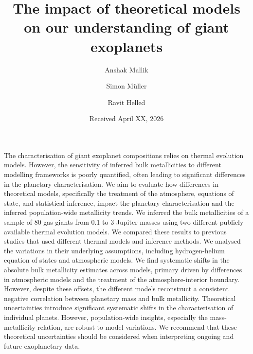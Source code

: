 \documentclass{aa}
\begin{document}
\title{The impact of theoretical models on our understanding of giant exoplanets}


\author{
    Anshak Mallik
    \and Simon M\"uller
    \and Ravit Helled
}


\date{Received April XX, 2026}
 
\abstract
{The characterisation of giant exoplanet compositions relies on thermal evolution models. However, the sensitivity of inferred bulk metallicities to different modelling frameworks is poorly quantified, often leading to significant differences in the planetary characterisation.}
{We aim to evaluate how differences in theoretical models, specifically the treatment of the atmosphere, equations of state, and statistical inference, impact the planetary characterisation and the inferred population-wide metallicity trends.} 
{We inferred the bulk metallicities of a sample of 80 gas giants from 0.1 to 3 Jupiter masses using two different publicly available thermal evolution models. We compared these results to previous studies that used different thermal models and inference methods. We analysed the variations in their underlying assumptions, including hydrogen-helium equation of states and  atmospheric models.}
{We find systematic shifts in the absolute bulk metallicity estimates across models, primary driven by differences in atmospheric models and the treatment of the atmosphere-interior boundary. However, despite these offsets, the different models reconstruct a consistent negative correlation between planetary mass and bulk metallicity.}
{Theoretical uncertainties introduce significant systematic shifts in the characterisation of individual planets. However, population-wide insights, especially the mass-metallicity relation, are robust to model variations. We recommend that these theoretical uncertainties should be considered when interpreting ongoing and future exoplanetary data.}
\end{document}
